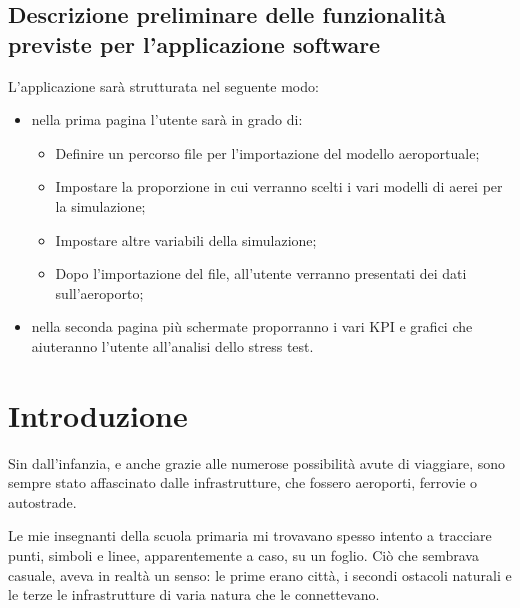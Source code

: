 \documentclass[a4paper, 12pt]{article}
\begin{document}
	\subsection{Descrizione preliminare delle funzionalità previste per l’applicazione software}
	
	L'applicazione sarà strutturata nel seguente modo:
	
	\begin{itemize}
	
	\item nella prima pagina l'utente sarà in grado di:
	
		\begin{itemize}
	
			\item Definire un percorso file per l'importazione del modello aeroportuale;
		  
			\item Impostare la proporzione in cui verranno scelti i vari modelli di aerei per la simulazione;
		  
			\item Impostare altre variabili della simulazione;
		  
			\item Dopo l'importazione del file, all'utente verranno presentati dei dati sull'aeroporto;
	
		\end{itemize}
	
		\item  nella seconda pagina più schermate proporranno i vari KPI e grafici che aiuteranno l'utente all'analisi dello stress test.
	
	\end{itemize}

\newpage


\section{Introduzione}

Sin dall'infanzia, e anche grazie alle numerose possibilità avute di viaggiare, sono sempre stato affascinato dalle infrastrutture, che fossero aeroporti, ferrovie o autostrade. 

Le mie insegnanti della scuola primaria mi trovavano spesso intento a tracciare punti, simboli e linee, apparentemente a caso, su un foglio. Ciò che sembrava casuale, aveva in realtà un senso: le prime erano città, i secondi ostacoli naturali e le terze le infrastrutture di varia natura che le connettevano.
\end{document}
